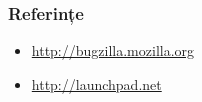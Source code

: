 \documentclass{beamer}
\begin{document}
\begin{frame}
\frametitle{Referințe}
\begin{itemize}
\item \url{http://bugzilla.mozilla.org}
\item \url{http://launchpad.net}
\end{itemize}
\end{frame}
\end{document}
